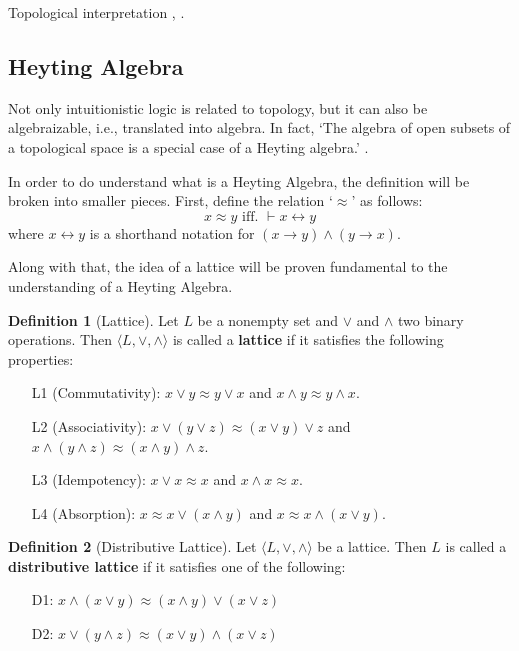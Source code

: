 \documentclass[12pt,a4paper]{article}
\theoremstyle{definition}
\newtheorem{definition}{Definition}[section]
\begin{document}
Topological interpretation \cite{vandalen-blackwell}, \cite{munkres2000topology}.

\subsection{Heyting Algebra}
\label{Heyting}

Not only intuitionistic logic is related to topology, but it can also be algebraizable, i.e., translated into algebra. In fact, `The algebra of open subsets of a topological space is a special case of a Heyting algebra.' \cite{van2017lej}.

In order to do understand what is a Heyting Algebra, the definition will be broken into smaller pieces. First, define the relation `$\approx$' as follows:
\[x \approx y \text{ iff. } \vdash x \leftrightarrow y\]
where $x \leftrightarrow y$ is a shorthand notation for $(x \to y) \land (y \to x)$.

Along with that, the idea of a lattice will be proven fundamental to the understanding of a Heyting Algebra.

\begin{definition}[Lattice]
    Let $L$ be a nonempty set and $\lor$ and $\land$ two binary operations. Then $\langle L, \lor, \land \rangle$ is called a \textbf{lattice} if it satisfies the following properties:
    \begin{itemize}
        \item[L1] (Commutativity): $x \lor y \approx y \lor x$ and $x \land y \approx y \land x$.
        \item[L2] (Associativity): $x \lor (y \lor z) \approx (x \lor y) \lor z$ and $x \land (y \land z) \approx (x \land y) \land z$.
        \item[L3] (Idempotency): $x \lor x \approx x$ and $x \land x \approx x$.
        \item[L4] (Absorption): $x \approx x \lor (x \land y)$ and $x \approx x \land (x \lor y)$.
    \end{itemize}
\end{definition}

\begin{definition}[Distributive Lattice]
    Let $\langle L, \lor, \land \rangle$ be a lattice. Then $L$ is called a \textbf{distributive lattice} if it satisfies one of the following:
    \begin{itemize}
        \item[D1:] $x \land (x \lor y) \approx (x \land y) \lor (x \lor z)$
        \item[D2:] $x \lor (y \land z) \approx (x \lor y) \land (x \lor z)$ 
    \end{itemize}
\end{definition}
\end{document}
